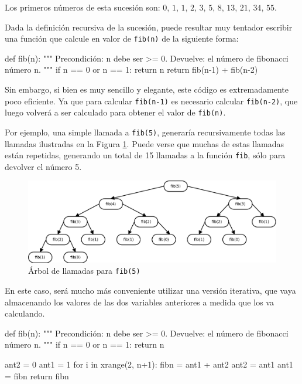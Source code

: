 Los primeros números de esta sucesión son: $0$, $1$, $1$, $2$, $3$, $5$, $8$,
$13$, $21$, $34$, $55$. 

Dada la definición recursiva de la sucesión, puede resultar muy tentador
escribir una función que calcule en valor de \lstinline!fib(n)! de la siguiente
forma:

\begin{codigo-python-sn}
def fib(n):
    """ Precondición: n debe ser >= 0.
        Devuelve: el número de fibonacci número n. """
    if n == 0 or n == 1:
        return n
    return fib(n-1) + fib(n-2)
\end{codigo-python-sn}

Sin embargo, si bien es muy sencillo y elegante, este código es extremadamente
poco eficiente.  Ya que para calcular \lstinline!fib(n-1)! es necesario calcular
\lstinline!fib(n-2)!, que luego volverá a ser calculado para obtener el valor de
\lstinline!fib(n)!.

Por ejemplo, una simple llamada a \lstinline!fib(5)!, generaría
recursivamente todas las llamadas ilustradas en la Figura \ref{fibonacci}.
Puede verse que muchas de estas llamadas están repetidas, generando un
total de 15 llamadas a la función \lstinline!fib!, sólo para devolver el
número 5.

\begin{figure}[htb]
\includegraphics{graficos/18_fibonacci}
\caption{Árbol de llamadas para \lstinline!fib(5)!}
\label{fibonacci}
\end{figure}

En este caso, será mucho más conveniente utilizar una versión iterativa,
que vaya almacenando los valores de las dos variables anteriores a medida
que los va calculando.  

\newpage

\begin{codigo-python-sn}
def fib(n):
    """ Precondición: n debe ser >= 0.
        Devuelve: el número de fibonacci número n. """
    if n == 0 or n == 1:
        return n

    ant2 = 0
    ant1 = 1
    for i in xrange(2, n+1):
        fibn = ant1 + ant2
        ant2 = ant1
        ant1 = fibn
    return fibn
\end{codigo-python-sn}

